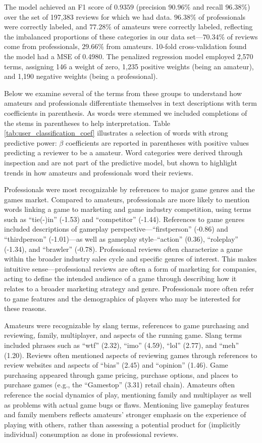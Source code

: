 \documentclass{sig-alternate}
\begin{document}
The model achieved an F1 score of $0.9359$ (precision $90.96\%$ and
recall $96.38\%$) over the set of 197,383 reviews for which we had data. $96.38\%$ of professionals were correctly labeled, and $77.28\%$ of amateurs were correctly labeled, reflecting the imbalanced proportions of these categories in our data set---$70.34\%$ of reviews come from professionals, $29.66\%$ from amateurs. 10-fold cross-validation found the model had a MSE of 0.4980. The penalized regression model employed 2,570 terms, assigning 146 a weight of zero, 1,235 positive weights (being an amateur), and 1,190 negative weights (being a professional). 

Below we examine several of the terms from these groups to understand how amateurs and professionals differentiate themselves in text descriptions with term coefficients in parenthesis. As words were stemmed we included completions of the stems in parentheses to help interpretation. Table \ref{tab:user_classification_coef} illustrates a selection of words with strong predictive power: $\beta$ coefficients are reported in parentheses with positive values predicting a reviewer to be a amateur. Word categories were derived through inspection and are not part of the predictive model, but shown to highlight trends in how amateurs and professionals word their reviews. 

Professionals were most recognizable by references to major game genres and the games market. Compared to amateurs, professionals are more likely to mention words linking a game to marketing and game industry competition, using terms such as ``tie(-)in'' (-1.53) and ``competitor'' (-1.44). References to game genres included descriptions of gameplay perspective---``firstperson'' (-0.86) and ``thirdperson'' (-1.01)---as well as gameplay style--``action'' (0.36), ``roleplay'' (-1.34),  and ``brawler'' (-0.78). Professional reviews often characterize a game within the broader industry sales cycle and specific genres of interest. This makes intuitive sense---professional reviews are often a form of marketing for companies, acting to define the intended audience of a game through describing how it relates to a broader marketing strategy and genre. Professionals more often refer to game features and the demographics of players who may be interested for these reasons.

Amateurs were recognizable by slang terms, references to game purchasing and reviewing, family, multiplayer, and aspects of the running game. Slang terms included phrases such as ``wtf'' (2.32), ``imo'' (4.59), ``lol'' (2.77), and ``meh'' (1.20). Reviews often mentioned aspects of reviewing games through references to review websites and aspects of ``bias'' (2.45) and ``opinion'' (1.46). Game purchasing appeared through game pricing, purchase options, and places to purchase games (e.g., the ``Gamestop'' (3.31) retail chain). Amateurs often reference the social dynamics of play, mentioning family and multiplayer as well as problems with actual game bugs or flaws. Mentioning live gameplay features and family members reflects amateurs' stronger emphasis on the experience of playing with others, rather than assessing a potential product for (implicitly individual) consumption as done in professional reviews.
\end{document}
